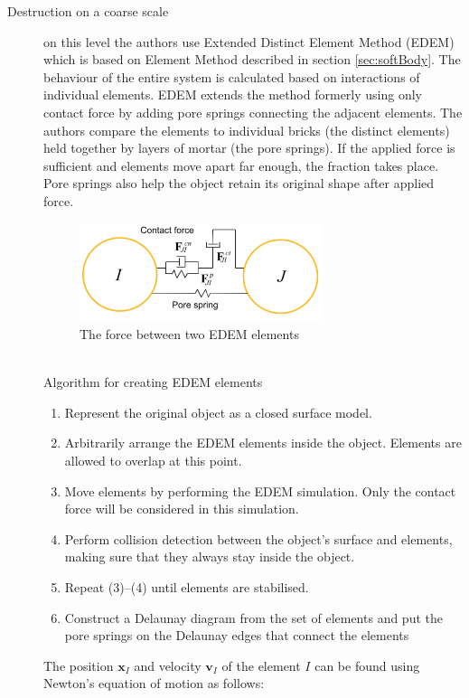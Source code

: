 \begin{description}
\item[Destruction on a coarse scale] on this level the authors use Extended Distinct Element Method (EDEM) which is based on Element Method described in section \ref{sec:softBody}. The behaviour of the entire system is calculated based on interactions of individual elements. EDEM extends the method formerly using only contact force by adding pore springs connecting the adjacent elements. The authors compare the elements to individual bricks (the distinct elements) held together by layers of mortar (the pore springs). If the applied force is sufficient and elements move apart far enough, the fraction takes place. Pore springs also help the object retain its original shape after applied force.
\begin{figure}[ht!]
        \centering
        \includegraphics[width=0.7\textwidth]{img/spring}
        \caption{The force between two EDEM elements \cite{edem}}
        \label{spring}
\end{figure}
\\Algorithm for creating EDEM elements
\begin{enumerate}
\item Represent the original object as a closed surface model.
\item Arbitrarily arrange the EDEM elements inside the object.
Elements are allowed to overlap at this point.
\item Move elements by performing the EDEM simulation. Only the contact force will be considered in this simulation.
\item Perform collision detection between the object’s surface
and elements, making sure that they always
stay inside the object.
\item Repeat (3)–(4) until elements are stabilised.
\item Construct a Delaunay diagram from the set of elements
and put the pore springs on the Delaunay edges that connect
the elements
\end{enumerate}
The position $\mathbf{x}_I$ and velocity $\mathbf{v}_I$ of the element $\mathit{I}$ can be found using Newton’s equation of motion as follows:
 

\end{description}
